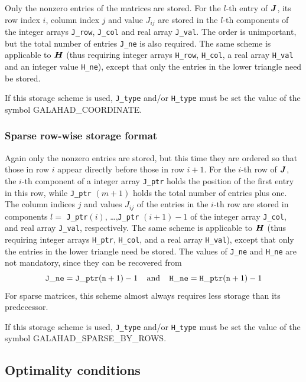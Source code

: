 \documentclass{galahad}
\newcommand{\sym}{\sf\small}
\begin{document}
Only the nonzero entries of the matrices are stored. For the 
$l$-th entry of ${\bm{J}}$, its row index $i$, column index $j$ 
and value $J_{ij}$
are stored in the $l$-th components of the integer arrays {\tt J\_row}, 
{\tt J\_col} and real array {\tt J\_val}. 
The order is unimportant, but the total
number of entries {\tt J\_ne} is also required. 
The same scheme is applicable to
${\bm{H}}$ (thus requiring integer arrays {\tt H\_row}, {\tt H\_col}, a real array 
{\tt H\_val} and an integer value {\tt H\_ne}),
except that only the entries in the lower triangle need be stored.

\noindent
If this storage scheme is used, {\tt J\_type} and/or {\tt H\_type} must be set
the value of the symbol {\sym GALAHAD\_COORDINATE}.

\subsubsection{Sparse row-wise storage format}\label{rowwise}

Again only the nonzero entries are stored, but this time
they are ordered so that those in row $i$ appear directly before those
in row $i+1$. For the $i$-th row of ${\bm{J}}$, the $i$-th component of a 
integer array {\tt J\_ptr} holds the position of the first entry in this row,
while {\tt J\_ptr} $(m+1)$ holds the total number of entries plus one.
The column indices $j$ and values $J_{ij}$ of the entries in the $i$-th row 
are stored in components 
$l =$ {\tt J\_ptr}$(i)$, \ldots ,{\tt J\_ptr} $(i+1)-1$ of the 
integer array {\tt J\_col}, and real array {\tt J\_val}, respectively. 
The same scheme is applicable to
${\bm{H}}$ (thus requiring integer arrays {\tt H\_ptr}, {\tt H\_col}, and 
a real array {\tt H\_val}),
except that only the entries in the lower triangle need be stored.
The values of {\tt J\_ne} and {\tt H\_ne} are not mandatory, since they can be
recovered from
\[
{\tt J\_ne} = {\tt J\_ptr}({\tt n}+1) - 1
\;\;\;\; \mbox{and} \;\;\;\;
{\tt H\_ne} = {\tt H\_ptr}({\tt n}+1) - 1
\]
For sparse matrices, this scheme almost always requires less storage than 
its predecessor.

\noindent
If this storage scheme is used, {\tt J\_type} and/or {\tt H\_type} must be set
the value of the symbol {\sym GALAHAD\_SPARSE\_BY\_ROWS}.


\subsection{Optimality conditions\label{galopt}}
\end{document}
